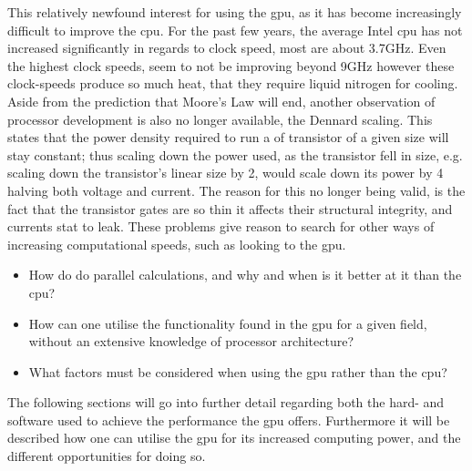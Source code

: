 This relatively newfound interest for using the \acrshort{gpu}, as it has become increasingly difficult to improve the \acrshort{cpu}.
For the past few years, the average Intel \acrshort{cpu} has not increased significantly in regards to clock speed, most are about 3.7GHz.
Even the highest clock speeds, seem to not be improving beyond 9GHz however these clock-speeds produce so much heat, that they require liquid nitrogen for cooling.
Aside from the prediction that Moore's Law will end, another observation of processor development is also no longer available, the Dennard scaling.
This states that the power density required to run a of transistor of a given size will stay constant; thus scaling down the power used, as the transistor fell in size, e.g. scaling down the transistor's linear size by 2, would scale down its power by 4 halving both voltage and current. \citep{DennardScaling}
The reason for this no longer being valid, is the fact that the transistor gates are so thin it affects their structural integrity, and currents stat to leak. \citep{CPUClockSpeeds}
These problems give reason to search for other ways of increasing computational speeds, such as looking to the \acrshort{gpu}.


\begin{itemize}
	\item How do  do parallel calculations, and why and when is it better at it than the \acrshort{cpu}?
	\item How can one utilise the functionality found in the \acrshort{gpu} for a given field, without an extensive knowledge of processor architecture?
	\item What factors must be considered when using the \acrshort{gpu} rather than the \acrshort{cpu}? 
\end{itemize}

The following sections will go into further detail regarding both the hard- and software used to achieve the performance the \acrshort{gpu} offers.
Furthermore it will be described how one can utilise the \acrshort{gpu} for its increased computing power, and the different opportunities for doing so. 

\newpage


